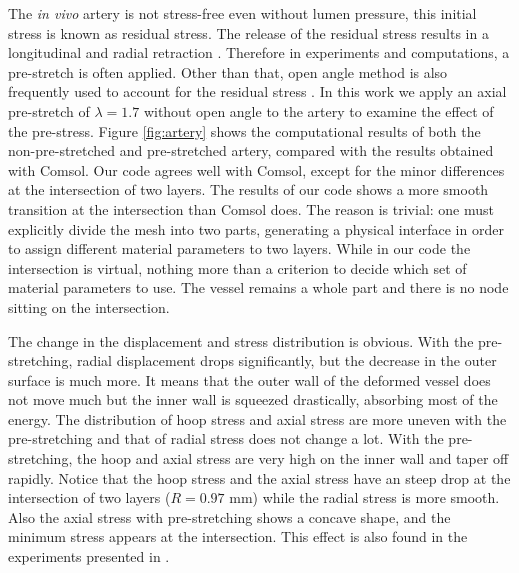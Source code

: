 The \emph{in vivo} artery is not stress-free even without lumen pressure, this initial stress is known as residual stress. The release of the residual stress results in a longitudinal and radial retraction \cite{Fung4, Holzapfel3}. Therefore in experiments and computations, a pre-stretch is often applied. Other than that, open angle method is also frequently used to account for the residual stress \cite{Kassab, Finet}. In this work we apply an axial pre-stretch of $\lambda = 1.7$ without open angle to the artery to examine the effect of the pre-stress. Figure \ref{fig:artery} shows the computational results of both the non-pre-stretched and pre-stretched artery, compared with the results obtained with Comsol. Our code agrees well with Comsol, except for the minor differences at the intersection of two layers. The results of our code shows a more smooth transition at the intersection than Comsol does. The reason is trivial: one must explicitly divide the mesh into two parts, generating a physical interface in order to assign different material parameters to two layers. While in our code the intersection is virtual, nothing more than a criterion to decide which set of material parameters to use. The vessel remains a whole part and there is no node sitting on the intersection.

The change in the displacement and stress distribution is obvious. With the pre-stretching, radial displacement drops significantly, but the decrease in the outer surface is much more. It means that the outer wall of the deformed vessel does not move much but the inner wall is squeezed drastically, absorbing most of the energy. The distribution of hoop stress and axial stress are more uneven with the pre-stretching and that of radial stress does not change a lot. With the pre-stretching, the hoop and axial stress are very high on the inner wall and taper off rapidly. Notice that the hoop stress and the axial stress have an steep drop at the intersection of two layers ($R = 0.97$ mm) while the radial stress is more smooth. Also the axial stress with pre-stretching shows a concave shape, and the minimum stress appears at the intersection. This effect is also found in the experiments presented in \cite{Keitzer}.

